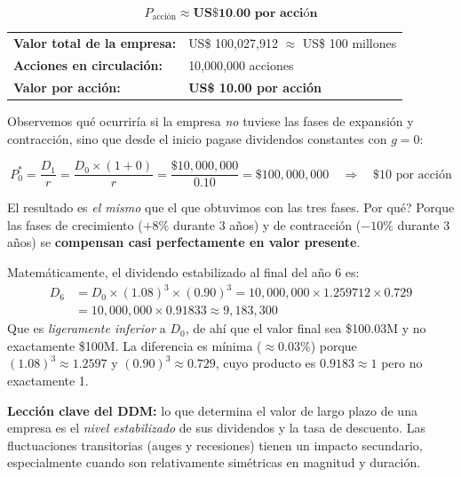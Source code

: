 \documentclass[12pt,a4paper]{article}
\begin{document}
\begin{tcolorbox}[colback=verdeclaro!80, colframe=green!40!black,
                  halign=center, boxsep=8pt]
\Large
\[
\boxed{P_{\text{acci\'on}} \approx \textbf{US\$ 10.00 por acci\'on}}
\]
\end{tcolorbox}

\vspace{1cm}

\begin{cajaresultado}
\begin{center}
\large
\begin{tabular}{p{7cm}p{5.5cm}}
\textbf{Valor total de la empresa:} & US\$ 100{,}027{,}912 $\approx$ US\$ 100 millones \\[4pt]
\textbf{Acciones en circulaci\'on:} & 10{,}000{,}000 acciones \\[4pt]
\textbf{Valor por acci\'on:}        & \textbf{US\$ 10.00 por acci\'on} \\
\end{tabular}
\end{center}
\end{cajaresultado}

\vspace{1cm}

\begin{cajareflexion}
Observemos qu\'e ocurrir\'ia si la empresa \emph{no} tuviese las fases de expansi\'on y
contracci\'on, sino que desde el inicio pagase dividendos constantes con $g = 0$:

\[
P_0^{*} = \frac{D_1}{r} = \frac{D_0 \times (1+0)}{r}
= \frac{\$10{,}000{,}000}{0.10} = \$100{,}000{,}000
\quad\Rightarrow\quad \$10 \text{ por acci\'on}
\]

El resultado es \emph{el mismo} que el que obtuvimos con las tres fases. \textquestiondown Por
qu\'e? Porque las fases de crecimiento ($+8\%$ durante 3 a\~nos) y de contracci\'on
($-10\%$ durante 3 a\~nos) se \textbf{compensan casi perfectamente en valor presente}.

Matem\'aticamente, el dividendo estabilizado al final del a\~no 6 es:
\begin{align*}
D_6 &= D_0 \times (1.08)^3 \times (0.90)^3
     = 10{,}000{,}000 \times 1.259712 \times 0.729 \\
    &= 10{,}000{,}000 \times 0.91833
     \approx 9{,}183{,}300
\end{align*}
Que es \emph{ligeramente inferior} a $D_0$, de ah\'i que el valor final sea
\$100.03M y no exactamente \$100M. La diferencia es m\'inima
($\approx 0.03\%$) porque $(1.08)^3 \approx 1.2597$ y $(0.90)^3 \approx 0.729$,
cuyo producto es $0.9183 \approx 1$ pero no exactamente 1.

\textbf{Lecci\'on clave del DDM:} lo que determina el valor de largo plazo de una empresa
es el \emph{nivel estabilizado} de sus dividendos y la tasa de descuento. Las fluctuaciones
transitorias (auges y recesiones) tienen un impacto secundario, especialmente cuando son
relativamente sim\'etricas en magnitud y duraci\'on.
\end{cajareflexion}
\end{document}

